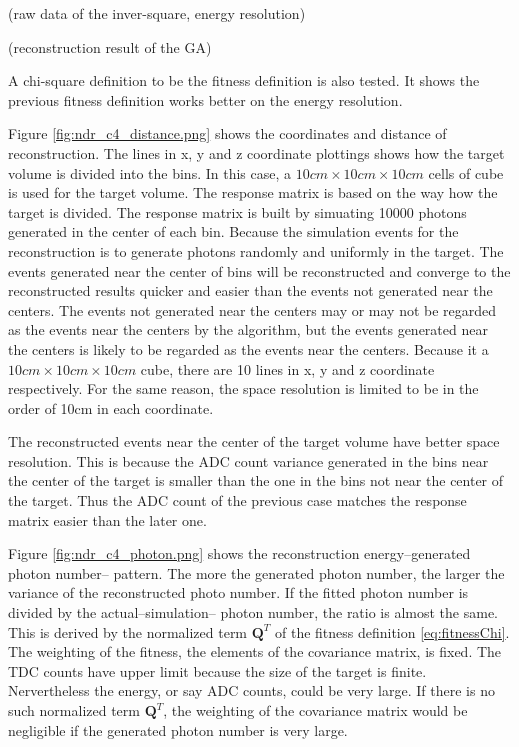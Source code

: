 (raw data of the inver-square, energy resolution)




(reconstruction result of the GA)


A chi-square definition to be the fitness definition is also tested.
It shows the previous fitness definition works better on the
energy resolution.


Figure \ref{fig:ndr_c4_distance.png} shows the coordinates and distance of reconstruction.
The lines in x, y and z coordinate plottings shows how the target volume is divided into the bins.
In this case, a $10cm\times10cm\times10cm$ cells of cube is used for the target volume. The response matrix
is based on the way how the target is divided. The response matrix is built by simuating 10000 photons
generated in the center of each bin. Because the simulation events for the reconstruction is to generate
photons randomly and uniformly in the target. The events generated near the center of bins will be reconstructed
and converge to the reconstructed results quicker and easier than the events not generated near the centers.
The events not generated near the centers may or may not be regarded as the events near the centers by the algorithm,
but the events generated near the centers is likely to be regarded as the events near the centers.
Because it a $10cm\times10cm\times10cm$ cube, there are 10 lines in x, y and z coordinate respectively.
For the same reason, the space resolution is limited to be in the order of 10cm in each coordinate.

The reconstructed events near the center of the target volume have better space resolution.
This is because the ADC count variance generated in the bins near the center of the target is smaller
than the one in the bins not near the center of the target. Thus the ADC count of the previous case
matches the response matrix easier than the later one.

Figure \ref{fig:ndr_c4_photon.png} shows the reconstruction energy--generated photon number-- pattern.
The more the generated photon number, the larger the variance of the reconstructed photo number.
If the fitted photon number is divided by the actual--simulation-- photon number, the ratio is
almost the same.
This is derived by the normalized term $\mathbf{Q}^T$ of the fitness definition \ref{eq:fitnessChi}.
The weighting of the fitness, the elements of the covariance matrix, is fixed. The TDC counts have upper limit
because the size of the target is finite. Nervertheless the energy, or say ADC counts, could be very large.
If there is no such normalized term $\mathbf{Q}^T$, the weighting of the covariance matrix would be negligible
if the generated photon number is very large.


